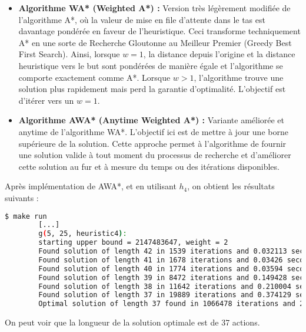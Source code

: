 \begin{itemize}
    \item \textbf{Algorithme WA* (Weighted A*) :} Version très légèrement modifiée de l'algorithme A*, où la valeur de mise en file d'attente dans le tas est davantage pondérée en faveur de l'heuristique. Ceci transforme techniquement A* en une sorte de Recherche Gloutonne au Meilleur Premier (Greedy Best First Search). Ainsi, lorsque \(w = 1\), la distance depuis l'origine et la distance heuristique vers le but sont pondérées de manière égale et l'algorithme se comporte exactement comme A*. Lorsque \(w > 1\), l'algorithme trouve une solution plus rapidement mais perd la garantie d'optimalité. L'objectif est d'itérer vers un \(w = 1\).
    
    \item \textbf{Algorithme AWA* (Anytime Weighted A*) :} Variante améliorée et anytime de l'algorithme WA*. L'objectif ici est de mettre à jour une borne supérieure de la solution. Cette approche permet à l'algorithme de fournir une solution valide à tout moment du processus de recherche et d'améliorer cette solution au fur et à mesure du temps ou des itérations disponibles.
\end{itemize}

Après implémentation de AWA*, et en utilisant $h_4$, on obtient les résultats suivants :

\begin{minipage}{\dimexpr\linewidth-20pt}
    \begin{lstlisting}[language=bash, caption={Résultats de l'exécution du programme de recherche de plus court chemin avec l'heuristique $h_4$ et \textit{AWA*} pour $k = 5$ piles et $n = 25$ blocs.}, label={lst:plus_court_chemin_results_h4_k4_n20}]
        $ make run
        [...]
        g(5, 25, heuristic4): 
        starting upper bound = 2147483647, weight = 2
        Found solution of length 42 in 1539 iterations and 0.032113 seconds
        Found solution of length 41 in 1678 iterations and 0.03426 seconds
        Found solution of length 40 in 1774 iterations and 0.03594 seconds
        Found solution of length 39 in 8472 iterations and 0.149428 seconds
        Found solution of length 38 in 11642 iterations and 0.210004 seconds
        Found solution of length 37 in 19889 iterations and 0.374129 seconds
        Optimal solution of length 37 found in 1066478 iterations and 21.8191 seconds
    \end{lstlisting}
\end{minipage}

On peut voir que la longueur de la solution optimale est de 37 actions.

